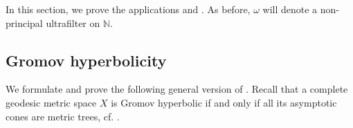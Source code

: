 \documentclass[a4paper,leqno]{amsart}
\numberwithin{equation}{section}
\theoremstyle{remark}
\theoremstyle{remark}
\newcommand{\N}{\mathbb{N}}
\begin{document}
In this section, we prove the applications  and . As before, $\omega$ will denote a non-principal ultrafilter on $\N$.

\subsection{Gromov hyperbolicity}\label{section-gromov-hyperbolicity}
We formulate and prove the following general version of . Recall that a complete geodesic metric space $X$ is Gromov hyperbolic if and only if all its asymptotic cones are metric trees, cf. \cite[Proposition 3.1.1]{drutu-2002-quasi-isometry-invariants-and-asymptotic-cones}.
\end{document}
